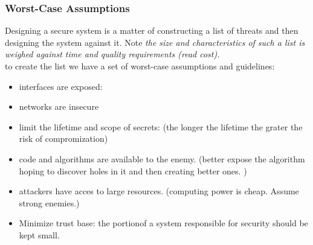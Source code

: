 \subsubsection{Worst-Case Assumptions }
Designing a secure system is a matter of constructing a list of threats and then designing the system against it. Note \textit{the size and characteristics of such a list is weighed against time and quality requirements (read cost).}\\

to create the list we have a set of worst-case assumptions and guidelines:

\begin{itemize}
\item interfaces are exposed: 
\item networks are insecure
\item limit the lifetime and scope of secrets: (the longer the lifetime the grater the risk of compromization)
\item code and algorithms are available to the enemy. (better expose the algorithm hoping to discover holes in it and then creating better ones. )
\item attackers have acces to large resources. (computing power is cheap. Assume strong enemies.)
\item Minimize trust base: the portionof a system responsible for security should be kept small. 
\end{itemize}
